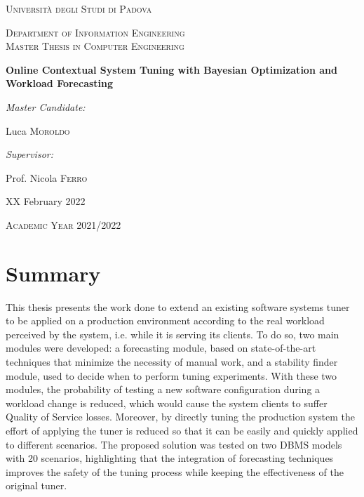\documentclass[a4paper, 12pt]{article} %
\begin{document}
	
	\begin{titlepage}
		\centering
		\vspace*{1cm}
		{\par \scshape\LARGE Università degli Studi di Padova \par}
		\vspace{1cm}
		{\scshape\Large Department of Information Engineering\\Master Thesis in Computer Engineering\par}
		\vspace{1.5cm}
		{\huge\bfseries Online Contextual System Tuning with Bayesian Optimization and Workload Forecasting\par}
		\vspace{2cm}
		{ \large \itshape Master Candidate:}
		{ \large Luca \textsc{Moroldo} \par}
		\vspace{0.7cm}
		{ \large \itshape Supervisor:}
		{ \large Prof. Nicola \textsc{Ferro} \par}
		\vfill
		
		{ \large XX February 2022 \par}
		{ \large \textsc{Academic Year 2021/2022}\par}
	\end{titlepage}
	
	\clearpage%
	\thispagestyle{empty}%
	\addtocounter{page}{-1}%
	\null%
	\clearpage
	
	\newpage
	\thispagestyle{plain}
	\section*{Summary}
	This thesis presents the work done to extend an existing software systems tuner to be applied on a production environment according to the real workload perceived by the system, i.e. while it is serving its clients.
	To do so, two main modules were developed: a forecasting module, based on state-of-the-art techniques that minimize the necessity of manual work, and a stability finder module, used to decide when to perform tuning experiments. With these two modules, the probability of testing a new software configuration during a workload change is reduced, which would cause the system clients to suffer Quality of Service losses.
	Moreover, by directly tuning the production system the effort of applying the tuner is reduced so that it can be easily and quickly applied to different scenarios.
	The proposed solution was tested on two DBMS models with 20 scenarios, highlighting that the integration of forecasting techniques improves the safety of the tuning process while keeping the effectiveness of the original tuner.
	
\end{document}
